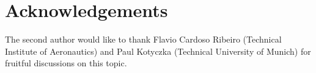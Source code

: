 \documentclass[11pt,a4paper]{article}
\begin{document}
\section*{Acknowledgements}

The second author would like to thank Flavio Cardoso Ribeiro (Technical Institute of Aeronautics) and Paul Kotyczka (Technical University of Munich) for fruitful discussions on this topic.



\end{document}
